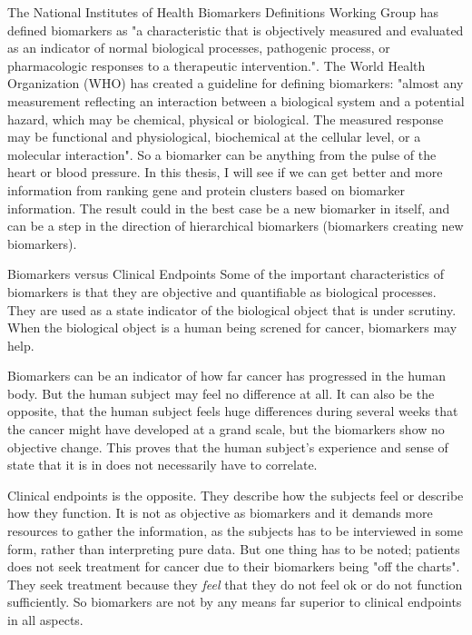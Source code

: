 The National Institutes of Health Biomarkers Definitions Working Group has
defined biomarkers as "a characteristic that is objectively measured and
evaluated as an indicator of normal biological processes, pathogenic process, or
pharmacologic responses to a therapeutic intervention.". The World Health
Organization (WHO) has created a guideline for defining biomarkers: "almost any
measurement reflecting an interaction between a biological system and a
potential hazard, which may be chemical, physical or biological. The measured
response may be functional and physiological, biochemical at the cellular level,
or a molecular interaction". So a biomarker can be anything from the pulse of
the heart or blood pressure. In this thesis, I will see if we can get better and
more information from ranking gene and protein clusters based on biomarker
information. The result could in the best case be a new biomarker in itself, and
can be a step in the direction of hierarchical biomarkers (biomarkers creating
new biomarkers).

Biomarkers versus Clinical Endpoints Some of the important characteristics of
biomarkers is that they are objective and quantifiable as biological processes.
They are used as a state indicator of the biological object that is under
scrutiny. When the biological object is a human being screned for cancer,
biomarkers may help.

Biomarkers can be an indicator of how far cancer has progressed in the human
body. But the human subject may feel no difference at all. It can also be the
opposite, that the human subject feels huge differences during several weeks
that the cancer might have developed at a grand scale, but the biomarkers show
no objective change. This proves that the human subject's experience and sense
of state that it is in does not necessarily have to correlate.

Clinical endpoints is the opposite. They describe how the subjects feel or
describe how they function. It is not as objective as biomarkers and it demands
more resources to gather the information, as the subjects has to be interviewed
in some form, rather than interpreting pure data. But one thing has to be noted;
patients does not seek treatment for cancer due to their biomarkers being "off
the charts". They seek treatment because they \textit{feel} that they do not
feel ok or do not function sufficiently. So biomarkers are not by any means far
superior to clinical endpoints in all aspects.

